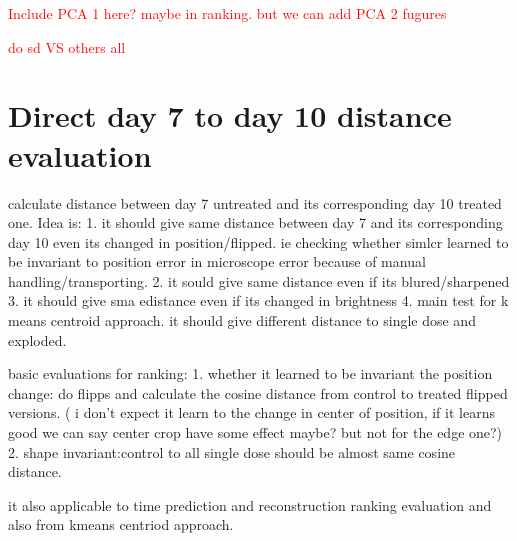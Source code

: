 \begin{table}[H]
    \centering
    \caption{Evaluation Results Using Different Distance Metrics}
    \label{tab:distance_metrics}
\end{table}



\textcolor{red}{Include PCA 1 here? maybe in ranking. but we can add PCA 2 fugures}

\textcolor{red}{do sd VS others all}





\section{Direct day 7 to day 10 distance evaluation}
calculate distance between day 7 untreated and its corresponding day 10 treated one.
Idea is:
1. it should give same distance between day 7 and its corresponding day 10
 even its changed in position/flipped. ie checking whether simlcr learned to 
 be invariant to position error in microscope error because of manual 
 handling/transporting.
2. it sould give same distance even if its blured/sharpened
3. it should give sma edistance even if its changed in brightness
4. main test for k means centroid approach. it should give different distance to single dose and exploded.


basic evaluations for ranking:
1.
whether it learned to be invariant the position change:
do flipps and calculate the cosine distance from control to treated flipped versions. ( i don't expect it learn to the change in center of position, 
if it learns good we can say center crop have some effect maybe? but not for the edge one?)
2. 
shape invariant:control to all single dose should be almost same cosine distance.

it also applicable to time prediction and reconstruction ranking evaluation and also from kmeans centriod approach.


